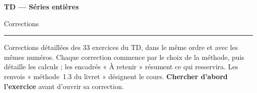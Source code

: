 \documentclass[a4paper,11pt]{article}
\numberwithin{equation}{section}
\numberwithin{figure}{section}
\numberwithin{table}{section}
\theoremstyle{enonce}
\theoremstyle{exemple}
\theoremstyle{remarque}
\begin{document}
\thispagestyle{plain}
{\sffamily\small\color{Gris}}\par\vspace{0.2em}
{\sffamily\bfseries\fontsize{26}{30}\selectfont\color{Ink}TD --- Séries entières}\par\vspace{0.3em}
{\sffamily\Large\color{BleuMoyen}Corrections}\par\vspace{0.4em}
{\color{Ocre}\rule{3.2cm}{1.4pt}}\par\vspace{0.8em}
{\small Corrections détaillées des 33 exercices du TD, dans le même ordre et avec les mêmes numéros.
Chaque correction commence par le choix de la méthode, puis détaille les calculs ; les encadrés « À retenir » résument ce qui
resservira. Les renvois « méthode~1.3 du livret » désignent le cours.
\textbf{Chercher d'abord l'exercice} avant d'ouvrir sa correction.}
\end{document}
